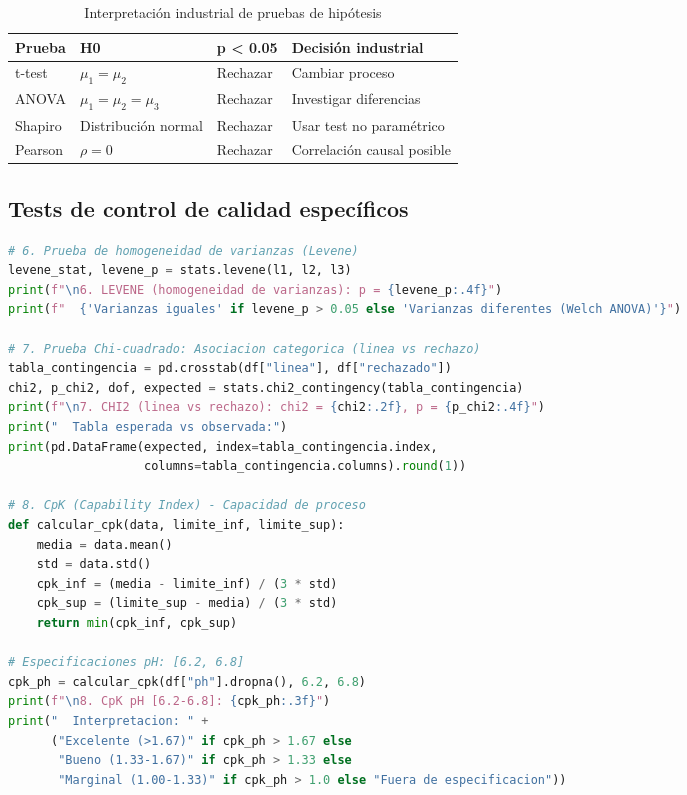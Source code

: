 \documentclass[11pt, a4paper]{article}
\begin{document}
\begin{table}[h]
\centering
\begin{tabular}{@{}lllp{4cm}@{}}
\toprule
\textbf{Prueba} & \textbf{H0} & \textbf{p < 0.05} & \textbf{Decisión industrial} \\
\midrule
t-test & $\mu_1 = \mu_2$ & Rechazar & Cambiar proceso \\
ANOVA & $\mu_1 = \mu_2 = \mu_3$ & Rechazar & Investigar diferencias \\
Shapiro & Distribución normal & Rechazar & Usar test no paramétrico \\
Pearson & $\rho = 0$ & Rechazar & Correlación causal posible \\
\bottomrule
\end{tabular}
\caption{Interpretación industrial de pruebas de hipótesis}
\end{table}

\subsection{Tests de control de calidad específicos}

\begin{lstlisting}[language=Python, caption={Tests para ingeniería de procesos}, upquote=true]
# 6. Prueba de homogeneidad de varianzas (Levene)
levene_stat, levene_p = stats.levene(l1, l2, l3)
print(f"\n6. LEVENE (homogeneidad de varianzas): p = {levene_p:.4f}")
print(f"  {'Varianzas iguales' if levene_p > 0.05 else 'Varianzas diferentes (Welch ANOVA)'}")

# 7. Prueba Chi-cuadrado: Asociacion categorica (linea vs rechazo)
tabla_contingencia = pd.crosstab(df["linea"], df["rechazado"])
chi2, p_chi2, dof, expected = stats.chi2_contingency(tabla_contingencia)
print(f"\n7. CHI2 (linea vs rechazo): chi2 = {chi2:.2f}, p = {p_chi2:.4f}")
print("  Tabla esperada vs observada:")
print(pd.DataFrame(expected, index=tabla_contingencia.index,
                   columns=tabla_contingencia.columns).round(1))

# 8. CpK (Capability Index) - Capacidad de proceso
def calcular_cpk(data, limite_inf, limite_sup):
    media = data.mean()
    std = data.std()
    cpk_inf = (media - limite_inf) / (3 * std)
    cpk_sup = (limite_sup - media) / (3 * std)
    return min(cpk_inf, cpk_sup)

# Especificaciones pH: [6.2, 6.8]
cpk_ph = calcular_cpk(df["ph"].dropna(), 6.2, 6.8)
print(f"\n8. CpK pH [6.2-6.8]: {cpk_ph:.3f}")
print("  Interpretacion: " +
      ("Excelente (>1.67)" if cpk_ph > 1.67 else
       "Bueno (1.33-1.67)" if cpk_ph > 1.33 else
       "Marginal (1.00-1.33)" if cpk_ph > 1.0 else "Fuera de especificacion"))
\end{lstlisting}
\end{document}
